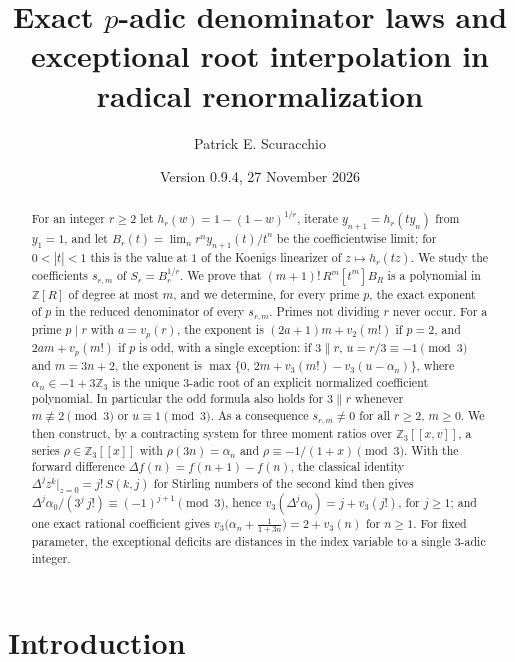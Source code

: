 \documentclass[11pt,reqno]{amsart}
\title[Exact $p$-adic denominator laws in radical renormalization]{Exact $p$-adic denominator laws and exceptional root interpolation in radical renormalization}
\author{Patrick E. Scuracchio}
\date{Version 0.9.4, 27 November 2026}
\theoremstyle{definition}
\theoremstyle{remark}
\theoremstyle{plain}
\newcommand{\Z}{\mathbb Z}
\begin{document}
\begin{abstract}
For an integer $r\ge2$ let $h_r(w)=1-(1-w)^{1/r}$, iterate $y_{n+1}=h_r(ty_n)$ from $y_1=1$, and let $B_r(t)=\lim_n r^ny_{n+1}(t)/t^n$ be the coefficientwise limit; for $0<|t|<1$ this is the value at $1$ of the Koenigs linearizer of $z\mapsto h_r(tz)$. We study the coefficients $s_{r,m}$ of $S_r=B_r^{1/r}$. We prove that $(m+1)!\,R^m[t^m]B_R$ is a polynomial in $\Z[R]$ of degree at most $m$, and we determine, for every prime $p$, the exact exponent of $p$ in the reduced denominator of every $s_{r,m}$. Primes not dividing $r$ never occur. For a prime $p\mid r$ with $a=v_p(r)$, the exponent is $(2a+1)m+v_2(m!)$ if $p=2$, and $2am+v_p(m!)$ if $p$ is odd, with a single exception: if $3\parallel r$, $u=r/3\equiv-1\pmod 3$ and $m=3n+2$, the exponent is $\max\{0,\,2m+v_3(m!)-v_3(u-\alpha_n)\}$, where $\alpha_n\in-1+3\Z_3$ is the unique $3$-adic root of an explicit normalized coefficient polynomial. In particular the odd formula also holds for $3\parallel r$ whenever $m\not\equiv2\pmod3$ or $u\equiv1\pmod3$. As a consequence $s_{r,m}\neq0$ for all $r\ge2$, $m\ge0$. We then construct, by a contracting system for three moment ratios over $\Z_3[[x,v]]$, a series $\rho\in\Z_3[[x]]$ with $\rho(3n)=\alpha_n$ and $\rho\equiv-1/(1+x)\pmod 3$. With the forward difference $\Delta f(n)=f(n+1)-f(n)$, the classical identity $\Delta^jz^k|_{z=0}=j!\,S(k,j)$ for Stirling numbers of the second kind then gives $\Delta^j\alpha_0/(3^j\,j!)\equiv(-1)^{j+1}\pmod 3$, hence $v_3(\Delta^j\alpha_0)=j+v_3(j!)$, for $j\ge1$; and one exact rational coefficient gives $v_3\bigl(\alpha_n+\tfrac1{1+3n}\bigr)=2+v_3(n)$ for $n\ge1$. For fixed parameter, the exceptional deficits are distances in the index variable to a single $3$-adic integer.
\end{abstract}

\maketitle

\tableofcontents

\section{Introduction}\label{sec:intro}
\end{document}

